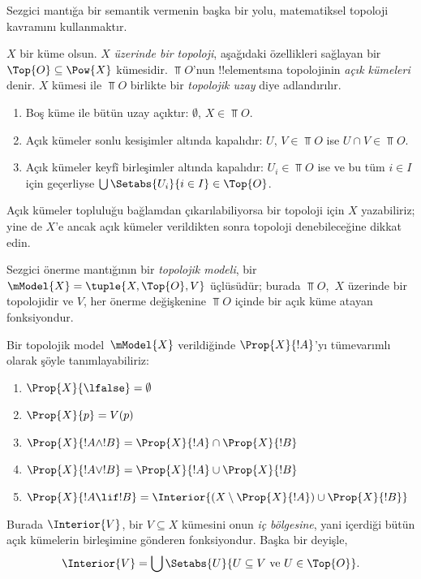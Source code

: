 



Sezgici mantığa bir semantik vermenin başka bir yolu, matematiksel topoloji
kavramını kullanmaktır.

\begin{defn}
  $X$ bir küme olsun. $X$ \emph{üzerinde bir topoloji}, aşağıdaki özellikleri
  sağlayan bir $\Top{O} \subseteq \Pow{X}$ kümesidir. $\Top{O}$'nun
  !!{element}s{}ına topolojinin \emph{açık kümeleri} denir. $X$ kümesi ile
  $\Top{O}$ birlikte bir \emph{topolojik uzay} diye adlandırılır.
  \begin{enumerate}
  \item Boş küme ile bütün uzay açıktır: $\emptyset$, $X \in \Top{O}$.
  \item Açık kümeler sonlu kesişimler altında kapalıdır: $U$, $V \in \Top{O}$
    ise $U \cap V \in \Top{O}$.
  \item Açık kümeler keyfî birleşimler altında kapalıdır: $U_i \in \Top{O}$
    ise ve bu tüm $i \in I$ için geçerliyse $\bigcup \Setabs{U_i}{i \in I}
    \in \Top{O}$.
  \end{enumerate}
\end{defn}

Açık kümeler topluluğu bağlamdan çıkarılabiliyorsa bir topoloji için $X$
yazabiliriz; yine de $X$'e ancak açık kümeler verildikten sonra topoloji
denebileceğine dikkat edin.

\begin{defn}
  Sezgici önerme mantığının bir \emph{topolojik modeli}, bir $\mModel{X} =
  \tuple{X, \Top{O}, V}$ üçlüsüdür; burada $\Top{O}$,~$X$ üzerinde bir
  topolojidir ve $V$, her önerme değişkenine $\Top{O}$ içinde bir açık küme
  atayan fonksiyondur.

  Bir topolojik model~$\mModel{X}$ verildiğinde $\Prop{X}{!A}$'yı tümevarımlı
  olarak şöyle tanımlayabiliriz:
  \begin{enumerate}
  \item $\Prop{X}{\lfalse} = \emptyset$
  \item $\Prop{X}{p} = V(p)$
  \item $\Prop{X}{!A \land !B} = \Prop{X}{!A} \cap \Prop{X}{!B}$
  \item $\Prop{X}{!A \lor !B} = \Prop{X}{!A} \cup \Prop{X}{!B}$
  \item $\Prop{X}{!A \lif !B} = \Interior{(X \setminus \Prop{X}{!A}) \cup
    \Prop{X}{!B}}$
  \end{enumerate}
  Burada $\Interior{V}$, bir $V \subseteq X$ kümesini onun \emph{iç
  bölgesine}, yani içerdiği bütün açık kümelerin birleşimine gönderen
  fonksiyondur. Başka bir deyişle,
  \[
  \Interior{V} = \bigcup \Setabs{U}{U \subseteq V \text{ ve } U \in \Top{O}}.
  \]
\end{defn}


